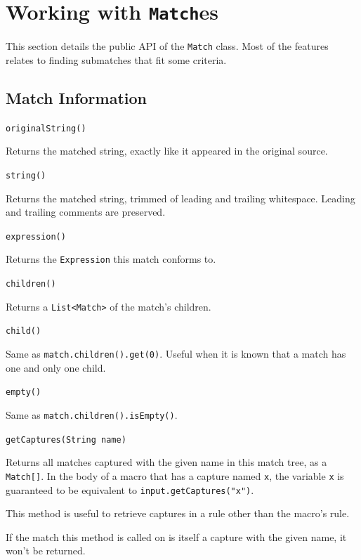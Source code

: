 \section{Working with \texttt{Match}es}
\label{match_api}

This section details the public API of the \texttt{Match} class. Most of the
features relates to finding submatches that fit some criteria.

\subsection{Match Information}

\begin{description}
\item \texttt{originalString()}

  Returns the matched string, exactly like it appeared in the original source.

\item \texttt{string()}

  Returns the matched string, trimmed of leading and trailing
  whitespace. Leading and trailing comments are preserved.

\item \texttt{expression()}

  Returns the \texttt{Expression} this match conforms to.

\item \texttt{children()}

  Returns a \texttt{List<Match>} of the match's children.

\item \texttt{child()}

  Same as \texttt{match.children().get(0)}. Useful when it is known that a match
  has one and only one child.

\item \texttt{empty()}

  Same as \texttt{match.children().isEmpty()}.

\item \texttt{getCaptures(String name)}

  Returns all matches captured with the given name in this match tree, as a
  \texttt{Match[]}. In the body of a macro that has a capture named \texttt{x},
  the variable \texttt{x} is guaranteed to be equivalent to
  \texttt{input.getCaptures("x")}.

  This method is useful to retrieve captures in a rule other than the macro's
  rule.

  If the match this method is called on is itself a capture with the given name,
  it won't be returned.

\end{description}


